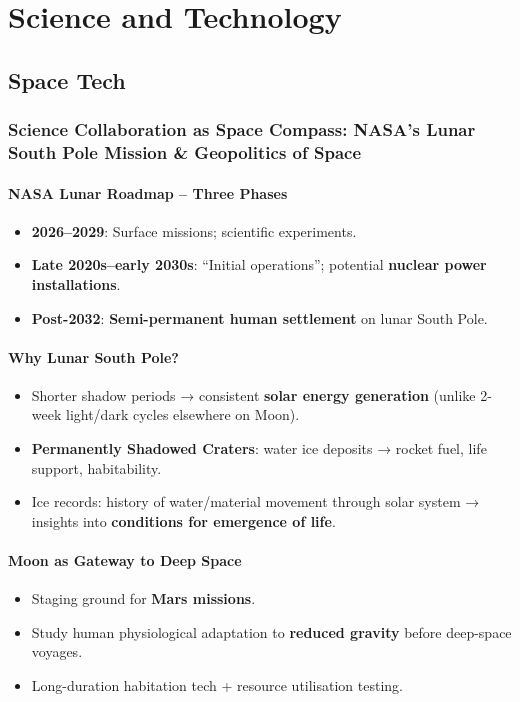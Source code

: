 
\chapter{Science and Technology}

\section{Space Tech}

\subsection{Science Collaboration as Space Compass: NASA's Lunar South Pole Mission \& Geopolitics of Space}

\subsubsection*{NASA Lunar Roadmap -- Three Phases}
\begin{itemize}
  \item \textbf{2026--2029}: Surface missions; scientific experiments.
  \item \textbf{Late 2020s--early 2030s}: ``Initial operations''; potential \textbf{nuclear power installations}.
  \item \textbf{Post-2032}: \textbf{Semi-permanent human settlement} on lunar South Pole.
\end{itemize}

\subsubsection*{Why Lunar South Pole?}
\begin{itemize}
  \item Shorter shadow periods → consistent \textbf{solar energy generation} (unlike 2-week light/dark cycles elsewhere on Moon).
  \item \textbf{Permanently Shadowed Craters}: water ice deposits → rocket fuel, life support, habitability.
  \item Ice records: history of water/material movement through solar system → insights into \textbf{conditions for emergence of life}.
\end{itemize}

\subsubsection*{Moon as Gateway to Deep Space}
\begin{itemize}
  \item Staging ground for \textbf{Mars missions}.
  \item Study human physiological adaptation to \textbf{reduced gravity} before deep-space voyages.
  \item Long-duration habitation tech + resource utilisation testing.
\end{itemize}

